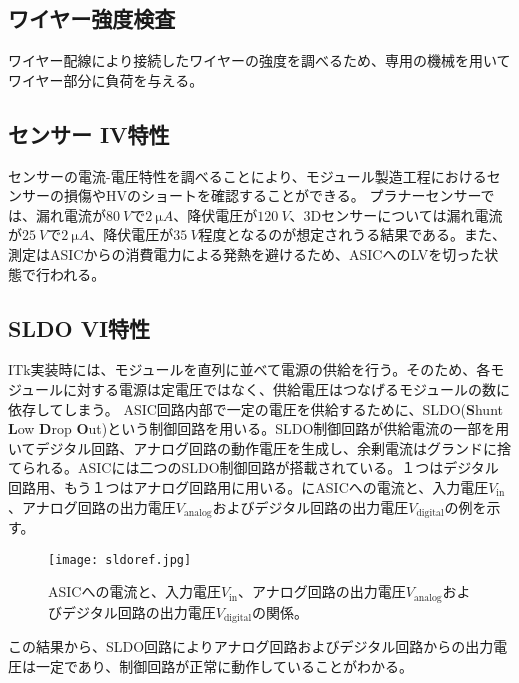 \subsection{ワイヤー強度検査}
\label{sec:mass}

ワイヤー配線により接続したワイヤーの強度を調べるため、専用の機械を用いてワイヤー部分に負荷を与える。


\subsection{センサー IV特性}
\label{sec:sensoriv}
センサーの電流-電圧特性を調べることにより、モジュール製造工程におけるセンサーの損傷やHVのショートを確認することができる。
プラナーセンサーでは、漏れ電流が$80\ \si{V}$で$2\ \si{\micro A}$、降伏電圧が$120\ \si{V}$、3Dセンサーについては漏れ電流が$25\ \si{V}$で$2\ \si{\micro A}$、降伏電圧が$35\ \si{V}$程度となるのが想定されうる結果である。また、測定はASICからの消費電力による発熱を避けるため、ASICへのLVを切った状態で行われる。


\subsection{SLDO VI特性}
\label{sec:sldovi}
ITk実装時には、モジュールを直列に並べて電源の供給を行う。そのため、各モジュールに対する電源は定電圧ではなく、供給電圧はつなげるモジュールの数に依存してしまう。
ASIC回路内部で一定の電圧を供給するために、SLDO(\textbf{S}hunt \textbf{L}ow \textbf{D}rop \textbf{O}ut)という制御回路を用いる。SLDO制御回路が供給電流の一部を用いてデジタル回路、アナログ回路の動作電圧を生成し、余剰電流はグランドに捨てられる。ASICには二つのSLDO制御回路が搭載されている。１つはデジタル回路用、もう１つはアナログ回路用に用いる。にASICへの電流と、入力電圧$V_\mathrm{in}$、アナログ回路の出力電圧$V_\mathrm{analog}$およびデジタル回路の出力電圧$V_\mathrm{digital}$の例を示す。
\begin{figure}[tbp]
  \centering
  \texttt{[image: sldoref.jpg]}
  \caption[ASICへの電流と、入力電圧$V_\mathrm{in}$、アナログ回路の出力電圧$V_\mathrm{analog}$およびデジタル回路の出力電圧$V_\mathrm{digital}$の関係]{ASICへの電流と、入力電圧$V_\mathrm{in}$、アナログ回路の出力電圧$V_\mathrm{analog}$およびデジタル回路の出力電圧$V_\mathrm{digital}$の関係\cite{sldo}。}
  \label{fig:sldoref}
\end{figure}
この結果から、SLDO回路によりアナログ回路およびデジタル回路からの出力電圧は一定であり、制御回路が正常に動作していることがわかる。

